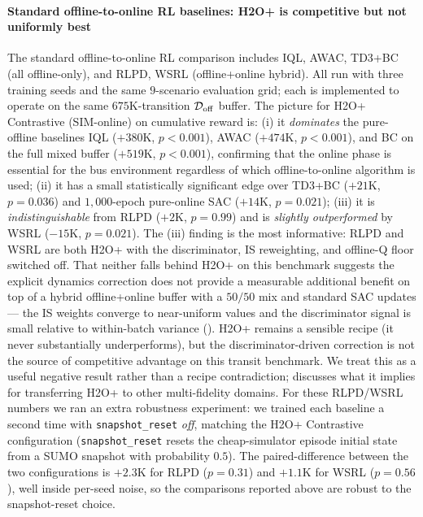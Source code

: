 \paragraph{Standard offline-to-online RL baselines: H2O+ is competitive but not uniformly best}
The standard offline-to-online RL comparison includes IQL, AWAC, TD3+BC (all offline-only), and RLPD, WSRL (offline+online hybrid). All run with three training seeds and the same $9$-scenario evaluation grid; each is implemented to operate on the same $675$K-transition $\mathcal{D}_{\mathrm{off}}$ buffer. The picture for H2O+ Contrastive (SIM-online) on cumulative reward is:
(i) it \emph{dominates} the pure-offline baselines IQL ($+380$K, $p < 0.001$), AWAC ($+474$K, $p < 0.001$), and BC on the full mixed buffer ($+519$K, $p < 0.001$), confirming that the online phase is essential for the bus environment regardless of which offline-to-online algorithm is used;
(ii) it has a small statistically significant edge over TD3+BC ($+21$K, $p = 0.036$) and $1{,}000$-epoch pure-online SAC ($+14$K, $p = 0.021$);
(iii) it is \emph{indistinguishable} from RLPD ($+2$K, $p = 0.99$) and is \emph{slightly outperformed} by WSRL ($-15$K, $p = 0.021$).
The (iii) finding is the most informative: RLPD and WSRL are both H2O+ with the discriminator, IS reweighting, and offline-Q floor switched off. That neither falls behind H2O+ on this benchmark suggests the explicit dynamics correction does not provide a measurable additional benefit on top of a hybrid offline+online buffer with a $50/50$ mix and standard SAC updates --- the IS weights converge to near-uniform values and the discriminator signal is small relative to within-batch variance (). H2O+ remains a sensible recipe (it never substantially underperforms), but the discriminator-driven correction is not the source of competitive advantage on this transit benchmark. We treat this as a useful negative result rather than a recipe contradiction;  discusses what it implies for transferring H2O+ to other multi-fidelity domains.
For these RLPD/WSRL numbers we ran an extra robustness experiment: we trained each baseline a second time with \texttt{snapshot\_reset} \emph{off}, matching the H2O+ Contrastive configuration (\texttt{snapshot\_reset} resets the cheap-simulator episode initial state from a SUMO snapshot with probability $0.5$). The paired-difference between the two configurations is $+2.3$K for RLPD ($p = 0.31$) and $+1.1$K for WSRL ($p = 0.56$), well inside per-seed noise, so the comparisons reported above are robust to the snapshot-reset choice.

